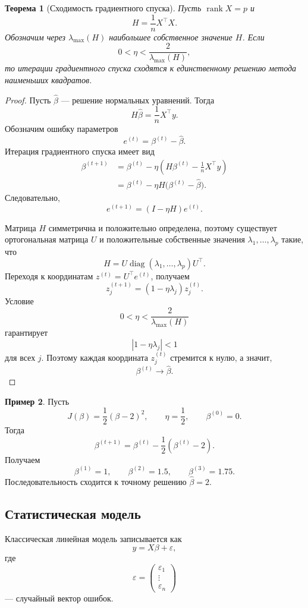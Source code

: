 \documentclass[12pt,a4paper]{article}
\newtheorem{theorem}{Теорема}[section]
\theoremstyle{definition}
\newtheorem{example}[theorem]{Пример}
\theoremstyle{remark}
\newcommand{\rank}{\operatorname{rank}}
\newcommand{\diag}{\operatorname{diag}}
\begin{document}
\begin{theorem}[Сходимость градиентного спуска]
Пусть $\rank X=p$ и
\[
    H=\frac{1}{n}X^\top X.
\]
Обозначим через $\lambda_{\max}(H)$ наибольшее собственное значение $H$.
Если
\[
    0<\eta<\frac{2}{\lambda_{\max}(H)},
\]
то итерации градиентного спуска сходятся к единственному решению метода
наименьших квадратов.
\end{theorem}

\begin{proof}
Пусть $\widehat\beta$ --- решение нормальных уравнений. Тогда
\[
    H\widehat\beta=\frac{1}{n}X^\top y.
\]
Обозначим ошибку параметров
\[
    e^{(t)}=\beta^{(t)}-\widehat\beta.
\]
Итерация градиентного спуска имеет вид
\[
\begin{split}
    \beta^{(t+1)}
    &=
    \beta^{(t)}
    -
    \eta
    \left(
        H\beta^{(t)}-\frac{1}{n}X^\top y
    \right)\\
    &=
    \beta^{(t)}-\eta H
    \bigl(\beta^{(t)}-\widehat\beta\bigr).
\end{split}
\]
Следовательно,
\[
    e^{(t+1)}=(I-\eta H)e^{(t)}.
\]

Матрица $H$ симметрична и положительно определена, поэтому существует
ортогональная матрица $U$ и положительные собственные значения
$\lambda_1,\ldots,\lambda_p$ такие, что
\[
    H=U\diag(\lambda_1,\ldots,\lambda_p)U^\top.
\]
Переходя к координатам $z^{(t)}=U^\top e^{(t)}$, получаем
\[
    z_j^{(t+1)}
    =
    (1-\eta\lambda_j)z_j^{(t)}.
\]
Условие
\[
    0<\eta<\frac{2}{\lambda_{\max}(H)}
\]
гарантирует
\[
    |1-\eta\lambda_j|<1
\]
для всех $j$. Поэтому каждая координата $z_j^{(t)}$ стремится к нулю,
а значит,
\[
    \beta^{(t)}\to\widehat\beta.
\]
\end{proof}

\begin{example}
Пусть
\[
    J(\beta)=\frac12(\beta-2)^2,
    \qquad
    \eta=\frac12,
    \qquad
    \beta^{(0)}=0.
\]
Тогда
\[
    \beta^{(t+1)}
    =
    \beta^{(t)}-\frac12(\beta^{(t)}-2).
\]
Получаем
\[
    \beta^{(1)}=1,\qquad
    \beta^{(2)}=1.5,\qquad
    \beta^{(3)}=1.75.
\]
Последовательность сходится к точному решению $\widehat\beta=2$.
\end{example}

\subsection{Статистическая модель}

Классическая линейная модель записывается как
\[
    y=X\beta+\varepsilon,
\]
где
\[
    \varepsilon=
    \begin{pmatrix}
        \varepsilon_1\\ \vdots\\\varepsilon_n
    \end{pmatrix}
\]
--- случайный вектор ошибок.
\end{document}
